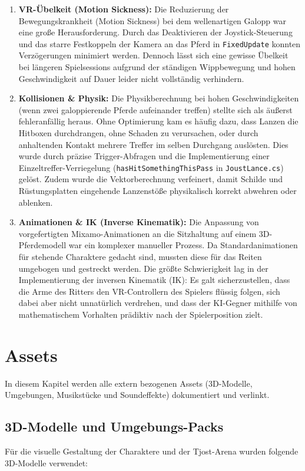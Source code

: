 \documentclass[11pt, a4paper]{article}
\begin{document}
\begin{enumerate}
    \item \textbf{VR-Übelkeit (Motion Sickness):} 
    Die Reduzierung der Bewegungskrankheit (Motion Sickness) bei dem wellenartigen Galopp war eine große Herausforderung. Durch das Deaktivieren der Joystick-Steuerung und das starre Festkoppeln der Kamera an das Pferd in \texttt{FixedUpdate} konnten Verzögerungen minimiert werden. Dennoch lässt sich eine gewisse Übelkeit bei längeren Spielsessions aufgrund der ständigen Wippbewegung und hohen Geschwindigkeit auf Dauer leider nicht vollständig verhindern.
    
    \item \textbf{Kollisionen \& Physik:} 
    Die Physikberechnung bei hohen Geschwindigkeiten (wenn zwei galoppierende Pferde aufeinander treffen) stellte sich als äußerst fehleranfällig heraus. Ohne Optimierung kam es häufig dazu, dass Lanzen die Hitboxen durchdrangen, ohne Schaden zu verursachen, oder durch anhaltenden Kontakt mehrere Treffer im selben Durchgang auslösten. Dies wurde durch präzise Trigger-Abfragen und die Implementierung einer Einzeltreffer-Verriegelung (\texttt{hasHitSomethingThisPass} in \texttt{JoustLance.cs}) gelöst. Zudem wurde die Vektorberechnung verfeinert, damit Schilde und Rüstungsplatten eingehende Lanzenstöße physikalisch korrekt abwehren oder ablenken.
    
    \item \textbf{Animationen \& IK (Inverse Kinematik):} 
    Die Anpassung von vorgefertigten Mixamo-Animationen an die Sitzhaltung auf einem 3D-Pferdemodell war ein komplexer manueller Prozess. Da Standardanimationen für stehende Charaktere gedacht sind, mussten diese für das Reiten umgebogen und gestreckt werden. Die größte Schwierigkeit lag in der Implementierung der inversen Kinematik (IK): Es galt sicherzustellen, dass die Arme des Ritters den VR-Controllern des Spielers flüssig folgen, sich dabei aber nicht unnatürlich verdrehen, und dass der KI-Gegner mithilfe von mathematischem Vorhalten prädiktiv nach der Spielerposition zielt.
\end{enumerate}

\newpage
\section{Assets}
In diesem Kapitel werden alle extern bezogenen Assets (3D-Modelle, Umgebungen, Musikstücke und Soundeffekte) dokumentiert und verlinkt.

\subsection{3D-Modelle und Umgebungs-Packs}
Für die visuelle Gestaltung der Charaktere und der Tjost-Arena wurden folgende 3D-Modelle verwendet:
\end{document}
